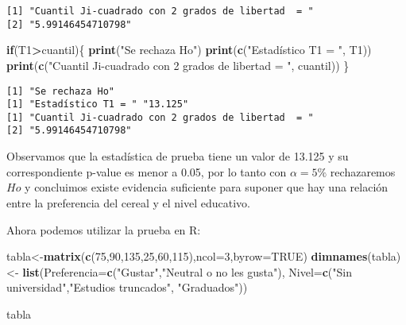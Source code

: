 \documentclass[a4paper,oneside,openany]{book}
\newenvironment{Shaded}{\begin{snugshade}}{\end{snugshade}}
\newcommand{\KeywordTok}[1]{\textcolor[rgb]{0.13,0.29,0.53}{\textbf{#1}}}
\newcommand{\DataTypeTok}[1]{\textcolor[rgb]{0.13,0.29,0.53}{#1}}
\newcommand{\DecValTok}[1]{\textcolor[rgb]{0.00,0.00,0.81}{#1}}
\newcommand{\StringTok}[1]{\textcolor[rgb]{0.31,0.60,0.02}{#1}}
\newcommand{\OtherTok}[1]{\textcolor[rgb]{0.56,0.35,0.01}{#1}}
\newcommand{\ControlFlowTok}[1]{\textcolor[rgb]{0.13,0.29,0.53}{\textbf{#1}}}
\newcommand{\OperatorTok}[1]{\textcolor[rgb]{0.81,0.36,0.00}{\textbf{#1}}}
\newcommand{\NormalTok}[1]{#1}
\begin{document}
\begin{verbatim}
[1] "Cuantil Ji-cuadrado con 2 grados de libertad  = "
[2] "5.99146454710798"                                
\end{verbatim}

\begin{Shaded}
\begin{Highlighting}[]
\ControlFlowTok{if}\NormalTok{(T1}\OperatorTok{>}\NormalTok{cuantil)\{}
  \KeywordTok{print}\NormalTok{(}\StringTok{"Se rechaza Ho"}\NormalTok{)}
  \KeywordTok{print}\NormalTok{(}\KeywordTok{c}\NormalTok{(}\StringTok{"Estadístico T1 = "}\NormalTok{, T1))}
  \KeywordTok{print}\NormalTok{(}\KeywordTok{c}\NormalTok{(}\StringTok{"Cuantil Ji-cuadrado con 2 grados de libertad  = "}\NormalTok{, cuantil))}
\NormalTok{\}}
\end{Highlighting}
\end{Shaded}

\begin{verbatim}
[1] "Se rechaza Ho"
[1] "Estadístico T1 = " "13.125"           
[1] "Cuantil Ji-cuadrado con 2 grados de libertad  = "
[2] "5.99146454710798"                                
\end{verbatim}

Observamos que la estadística de prueba tiene un valor de 13.125 y su
correspondiente p-value es menor a 0.05, por lo tanto con \(\alpha=5\%\)
rechazaremos \(Ho\) y concluimos existe evidencia suficiente para
suponer que hay una relación entre la preferencia del cereal y el nivel
educativo.

Ahora podemos utilizar la prueba en R:

\begin{Shaded}
\begin{Highlighting}[]
\NormalTok{tabla<-}\KeywordTok{matrix}\NormalTok{(}\KeywordTok{c}\NormalTok{(}\DecValTok{75}\NormalTok{,}\DecValTok{90}\NormalTok{,}\DecValTok{135}\NormalTok{,}\DecValTok{25}\NormalTok{,}\DecValTok{60}\NormalTok{,}\DecValTok{115}\NormalTok{),}\DataTypeTok{ncol=}\DecValTok{3}\NormalTok{,}\DataTypeTok{byrow=}\OtherTok{TRUE}\NormalTok{)}
\KeywordTok{dimnames}\NormalTok{(tabla)<-}\StringTok{ }\KeywordTok{list}\NormalTok{(}\DataTypeTok{Preferencia=}\KeywordTok{c}\NormalTok{(}\StringTok{"Gustar"}\NormalTok{,}\StringTok{"Neutral o no les gusta"}\NormalTok{), }\DataTypeTok{Nivel=}\KeywordTok{c}\NormalTok{(}\StringTok{"Sin universidad"}\NormalTok{,}\StringTok{"Estudios truncados"}\NormalTok{,}
                      \StringTok{"Graduados"}\NormalTok{))}


\NormalTok{tabla}
\end{Highlighting}
\end{Shaded}
\end{document}
